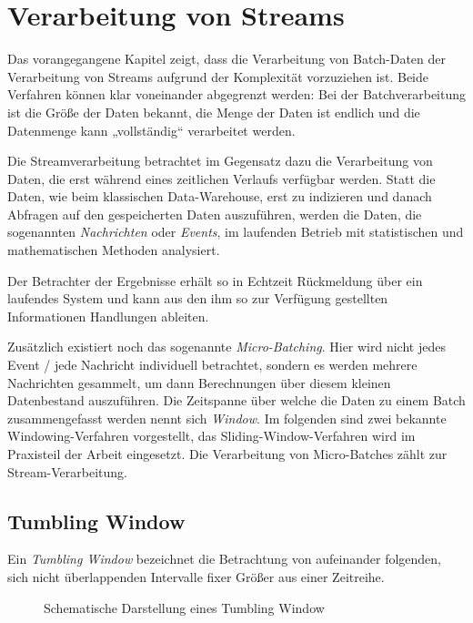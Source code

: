 \documentclass[a4paper,11pt]{scrartcl}
\begin{document}
  \section{Verarbeitung von Streams}
  Das vorangegangene Kapitel zeigt, dass die Verarbeitung von Batch-Daten der
  Verarbeitung von Streams aufgrund der Komplexität vorzuziehen ist. Beide
  Verfahren können klar voneinander abgegrenzt werden: Bei der Batchverarbeitung
  ist die Größe der Daten bekannt, die Menge der Daten ist endlich und die
  Datenmenge kann „vollständig“ verarbeitet werden.

  Die Streamverarbeitung betrachtet im Gegensatz dazu die Verarbeitung von
  Daten, die erst während eines zeitlichen Verlaufs verfügbar werden. Statt die
  Daten, wie beim klassischen Data-Warehouse, erst zu indizieren und danach
  Abfragen auf den gespeicherten Daten auszuführen, werden die Daten, die
  sogenannten \textit{Nachrichten} oder \textit{Events}, im laufenden Betrieb
  mit statistischen und mathematischen Methoden analysiert.

  Der Betrachter der Ergebnisse erhält so in Echtzeit Rückmeldung über ein
  laufendes System und kann aus den ihm so zur Verfügung gestellten Informationen
  Handlungen ableiten.

  Zusätzlich existiert noch das sogenannte \textit{Micro-Batching}.  Hier wird
  nicht jedes Event / jede Nachricht individuell betrachtet, sondern es werden
  mehrere Nachrichten gesammelt, um dann Berechnungen über diesem kleinen
  Datenbestand auszuführen. Die Zeitspanne über welche die Daten zu einem Batch
  zusammengefasst werden nennt sich \textit{Window}.\cite[S.~452]{kleppmann17}
  Im folgenden sind zwei bekannte Windowing-Verfahren vorgestellt, das
  Sliding-Window-Verfahren wird im Praxisteil der Arbeit eingesetzt. Die
  Verarbeitung von Micro-Batches zählt zur Stream-Verarbeitung.

  \subsection{Tumbling Window}
  Ein \textit{Tumbling Window} bezeichnet die Betrachtung von aufeinander
  folgenden, sich nicht überlappenden Intervalle fixer Größer aus einer
  Zeitreihe.
  \begin{figure}[!h]
    \centering
    \caption{Schematische Darstellung eines Tumbling Window}
  \end{figure}
\end{document}
